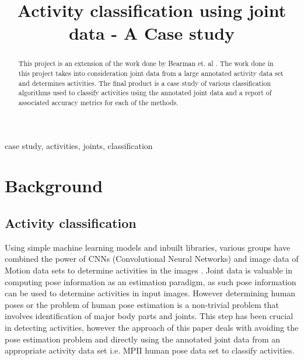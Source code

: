 \documentclass[conference]{IEEEtran}
\begin{document}
\title{Activity classification using joint data - A Case study\\


}

\author{
\and
{}

}

\maketitle

\begin{abstract}
This project is an extension of the work done by Bearman et. al \cite{b1}. The work done in this project takes into consideration joint data from a large annotated activity data set and determines activities. The final product is a case study of various classification algorithms used to classify activities using the annotated joint data and a report of associated accuracy metrics for each of the methods.
\end{abstract}

\begin{IEEEkeywords}
case study, activities, joints, classification
\end{IEEEkeywords}



\section{Background}

\subsection{Activity classification}

Using simple machine learning models and inbuilt libraries, various groups have combined the power of CNNs (Convolutional Neural Networks) and image data of Motion data sets to determine activities in the images \cite{b1}. Joint data is valuable in computing pose information as an estimation paradigm, as such pose information can be used to determine activities in input images. However determining human poses or the problem of human pose estimation is a non-trivial problem that involves identification of major body parts and joints. This step has been crucial in detecting activities, however the approach of this paper deals with avoiding the pose estimation problem and directly using the annotated joint data from an appropriate activity data set i.e. MPII human pose data set\cite{b2} to classify activities.  
\end{document}
